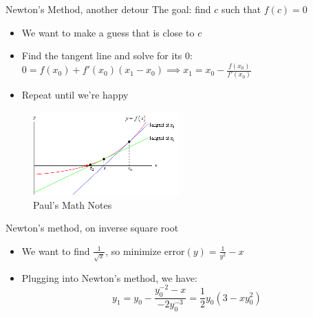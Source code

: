 \documentclass[aspectratio=169]{beamer}
\begin{document}
\begin{frame}{Newton's Method, another detour}
    The goal: find $c$ such that $f(c) = 0$\pause 
    \begin{itemize}
        \item We want to make a guess that is close to $c$ \pause 
        \item Find the tangent line and solve for its $0$: $0 = f(x_0) + f'(x_0)(x_1 - x_0) \implies x_1 = x_0 - \frac{f(x_0)}{f'(x_0)}$ \pause
        \item Repeat until we're happy \pause 
    \end{itemize}
    \begin{figure}
        \centering
        \includegraphics[width=0.5\textwidth]{image001.png}
        \caption{Paul's Math Notes}
    \end{figure}
\end{frame}

\begin{frame}{Newton's method, on inverse square root}
    \begin{itemize}
        \item We want to find $\frac{1}{\sqrt{x}}$, so minimize $\text{error}(y) = \frac{1}{y^2} - x$
        \item Plugging into Newton's method, we have: 
        $$y_1 = y_0 - \frac{y_0^{-2} - x}{-2y_0^{-3}} = \frac{1}{2}y_0(3 - xy_0^2)$$
    \end{itemize}
\end{frame}

\end{document}
